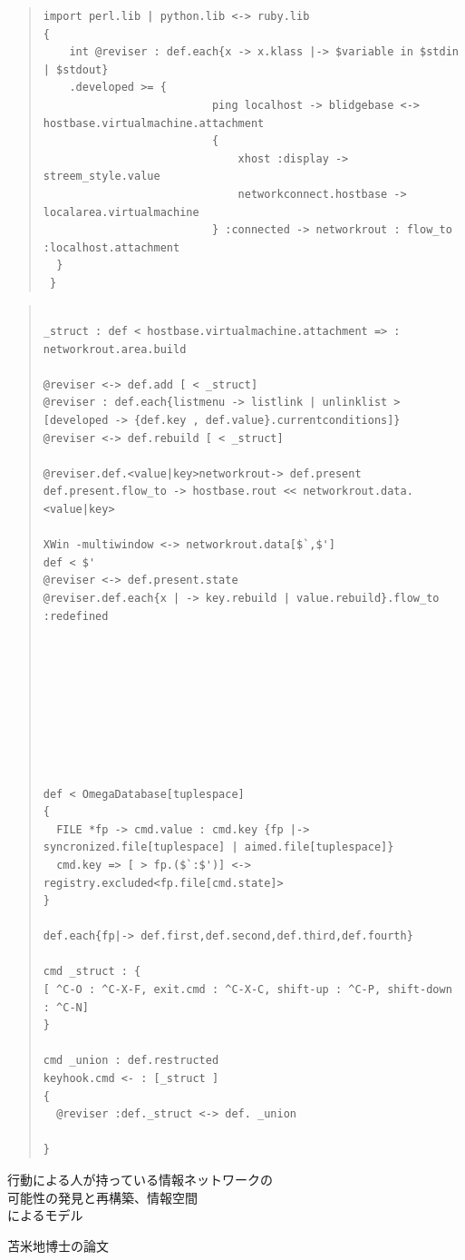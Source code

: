 \documentclass{jsarticle}
\begin{document}
{\begin{quote}
\begin{verbatim}
import perl.lib | python.lib <-> ruby.lib
{
	int @reviser : def.each{x -> x.klass |-> $variable in $stdin | $stdout}
	.developed >= {
                          ping localhost -> blidgebase <-> hostbase.virtualmachine.attachment
                          {
                              xhost :display -> streem_style.value
                              networkconnect.hostbase -> localarea.virtualmachine 
                          } :connected -> networkrout : flow_to :localhost.attachment
  }
 } 

\end{verbatim}
\end{quote}

\begin{quote}
\setlength{\baselineskip}{12pt}
\begin{verbatim}

_struct : def < hostbase.virtualmachine.attachment => : networkrout.area.build

@reviser <-> def.add [ < _struct]
@reviser : def.each{listmenu -> listlink | unlinklist > [developed -> {def.key , def.value}.currentconditions]}
@reviser <-> def.rebuild [ < _struct]

@reviser.def.<value|key>networkrout-> def.present
def.present.flow_to -> hostbase.rout << networkrout.data.<value|key>

XWin -multiwindow <-> networkrout.data[$`,$']
def < $'
@reviser <-> def.present.state
@reviser.def.each{x | -> key.rebuild | value.rebuild}.flow_to :redefined









def < OmegaDatabase[tuplespace]
{
  FILE *fp -> cmd.value : cmd.key {fp |-> syncronized.file[tuplespace] | aimed.file[tuplespace]}
  cmd.key => [ > fp.($`:$')] <-> registry.excluded<fp.file[cmd.state]>
}

def.each{fp|-> def.first,def.second,def.third,def.fourth}

cmd _struct : {
[ ^C-O : ^C-X-F, exit.cmd : ^C-X-C, shift-up : ^C-P, shift-down : ^C-N]
}

cmd _union : def.restructed
keyhook.cmd <- : [_struct ]
{
  @reviser :def._struct <-> def. _union

}

\end{verbatim}
\end{quote}



\newpage
\begin{center}
\large	行動による人が持っている情報ネットワークの \\
可能性の発見と再構築、情報空間 \\
によるモデル
\end{center}
\begin{center}
	苫米地博士の論文
\end{center}

}
\end{document}
